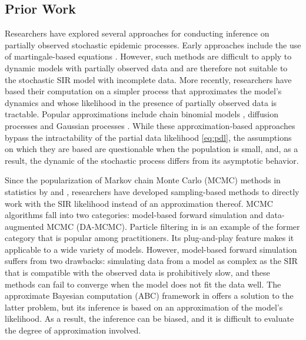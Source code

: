 \documentclass[12pt]{article}
\begin{document}
	\subsection{Prior Work}
	\label{sec:pre}
	Researchers have explored several approaches for conducting inference on partially observed stochastic epidemic processes. Early approaches include the use of martingale-based equations \citep{Becker.1977, Watson.1981}. However, such methods are difficult to apply to dynamic models with partially observed data and are therefore not suitable to the stochastic SIR model with incomplete data.
	More recently, researchers have based their computation on a simpler process that approximates the model's dynamics and whose likelihood in the presence of partially observed data is tractable. Popular approximations include chain binomial models \citep{Greenwood.1931, Abbey.1952}, diffusion processes \citep{Cauchemez.2008, Fintzi.2020} and Gaussian processes \citep{Jandarov.2014}. While these approximation-based approaches bypass the intractability of the partial data likelihood \eqref{eq:pdl}, the assumptions on which they are based are questionable when the population is small, and, as a result, the dynamic of the stochastic process differs from its asymptotic behavior.
	
	Since the popularization of Markov chain Monte Carlo (MCMC) methods in statistics by \cite{Gelfand.1990} and \cite{Tierney.1994}, researchers have developed sampling-based methods to directly work with the SIR likelihood instead of an approximation thereof. MCMC algorithms fall into two categories: model-based forward simulation and data-augmented MCMC (DA-MCMC).
	Particle filtering in \cite{King.2015} is an example of the former category that is popular among practitioners. Its plug-and-play feature makes it applicable to a wide variety of models. However, model-based forward simulation suffers from two drawbacks: simulating data from a model as complex as the SIR that is compatible with the observed data is prohibitively slow, and these methods can fail to converge when the model does not fit the data well. The approximate Bayesian computation (ABC) framework in \cite{McKinley.2018} offers a solution to the latter problem, but its inference is based on an approximation of the model's likelihood. As a result, the inference can be biased, and it is difficult to evaluate the degree of approximation involved. %
	
\end{document}
